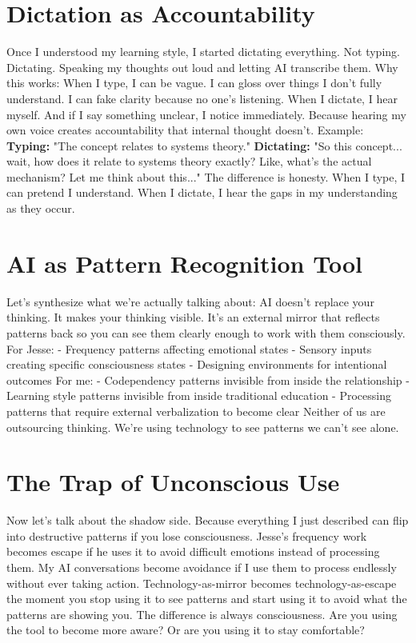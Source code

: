 \documentclass[12pt,openany]{book}
\begin{document}
\section{Dictation as Accountability}

Once I understood my learning style, I started dictating everything.
Not typing. Dictating. Speaking my thoughts out loud and letting AI transcribe them.
Why this works:
When I type, I can be vague. I can gloss over things I don't fully understand. I can fake clarity because no one's listening.
When I dictate, I hear myself.
And if I say something unclear, I notice immediately. Because hearing my own voice creates accountability that internal thought doesn't.
Example:
\textbf{Typing:} "The concept relates to systems theory."
\textbf{Dictating:} "So this concept... wait, how does it relate to systems theory exactly? Like, what's the actual mechanism? Let me think about this..."
The difference is honesty.
When I type, I can pretend I understand. When I dictate, I hear the gaps in my understanding as they occur.

\section{AI as Pattern Recognition Tool}

Let's synthesize what we're actually talking about:
AI doesn't replace your thinking. It makes your thinking visible.
It's an external mirror that reflects patterns back so you can see them clearly enough to work with them consciously.
For Jesse:
- Frequency patterns affecting emotional states
- Sensory inputs creating specific consciousness states
- Designing environments for intentional outcomes
For me:
- Codependency patterns invisible from inside the relationship
- Learning style patterns invisible from inside traditional education
- Processing patterns that require external verbalization to become clear
Neither of us are outsourcing thinking. We're using technology to see patterns we can't see alone.

\section{The Trap of Unconscious Use}

Now let's talk about the shadow side.
Because everything I just described can flip into destructive patterns if you lose consciousness.
Jesse's frequency work becomes escape if he uses it to avoid difficult emotions instead of processing them.
My AI conversations become avoidance if I use them to process endlessly without ever taking action.
Technology-as-mirror becomes technology-as-escape the moment you stop using it to see patterns and start using it to avoid what the patterns are showing you.
The difference is always consciousness.
Are you using the tool to become more aware? Or are you using it to stay comfortable?
\end{document}
